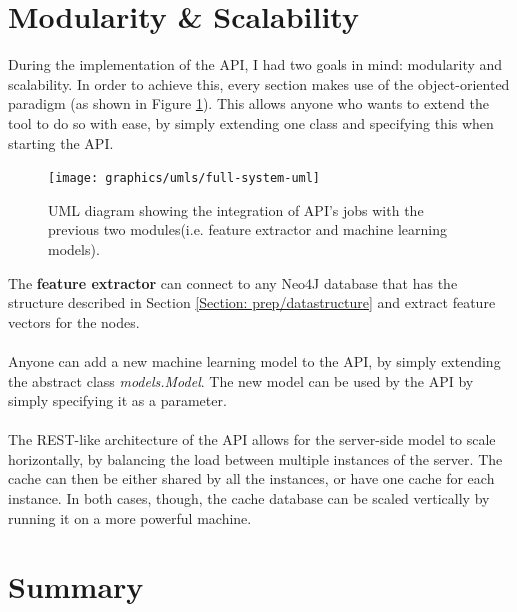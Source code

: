 	\section{Modularity \& Scalability} \label{Section: impl/modularity&scalability}
	During the implementation of the API, I had two goals in mind: modularity and scalability. In order to achieve this, every section makes use of the object-oriented paradigm (as shown in Figure \ref{Fig: impl/REST/API-integrate}). This allows anyone who wants to extend the tool to do so with ease, by simply extending one class and specifying this when starting the API.  
	\begin{figure}[H]
		\centering
		\texttt{[image: graphics/umls/full-system-uml]}
		\caption[General UML diagram]{\centering UML diagram showing the integration of API's jobs with the previous two modules(i.e. feature extractor and machine learning models).}
		\label{Fig: impl/REST/API-integrate}
	\end{figure}
	The \textbf{feature extractor} can connect to any Neo4J database that has the structure described in Section \ref{Section: prep/datastructure} and extract feature vectors for the nodes. 
	\\ \\
	Anyone can add a new machine learning model to the API, by simply extending the abstract class \textit{models.Model}. The new model can be used by the API by simply specifying it as a parameter.  
	\\ \\
	The REST-like architecture of the API allows for the server-side model to scale horizontally, by balancing the load between multiple instances of the server. The cache can then be either shared by all the instances, or have one cache for each instance. In both cases, though, the cache database can be scaled vertically by running it on a more powerful machine. 
	
	\section{Summary} \label{Section: impl/summary}
